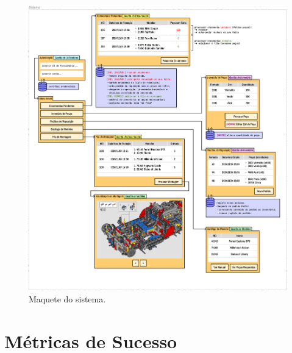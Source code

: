         \begin{figure}
            \centering
            \includegraphics[width=\textwidth]{images/cap1_maquete.pdf}
            \caption{Maquete do sistema.}
            \label{fig:maquete}
        \end{figure}

        
    \newpage
    \section{Métricas de Sucesso}

